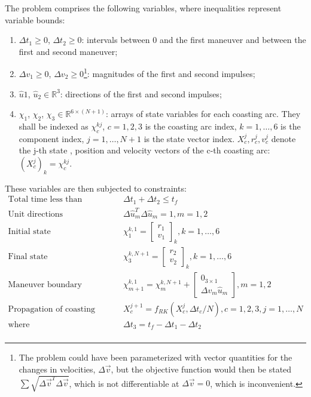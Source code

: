 The problem comprises the following variables, where inequalities represent variable bounds:
\begin{enumerate}
    \item \(\Delta t_1 \geq 0\), \(\Delta t_2 \geq 0\): intervals between 0 and the first maneuver and between the first and second maneuver;
    \item \(\Delta v_1 \geq 0\), \(\Delta v_2 \geq 0\)\footnote{The problem could have been parameterized with vector quantities for the changes in velocities, \(\Delta \vec v\), but the objective function would then be stated \(\sum \sqrt{\Delta \vec v^T \Delta \vec v}\), which is not differentiable at \(\Delta \vec v = 0\), which is inconvenient.}: magnitudes of the first and second impulses;
    \item \(\hat u 1\), \(\hat u_2 \in \mathbb{R}^3\): directions of the first and second impulses;
    \item \(\chi_1\), \(\chi_2\), \(\chi_3 \in \mathbb{R}^{6 \times (N+1)}\): arrays of state variables for each coasting arc. They shall be indexed as \(\chi_c^{kj}\), \(c=1, 2, 3\) is the coasting arc index, \(k=1,\dots,6\) is the component index, \(j = 1,\dots,N+1\) is the state vector index. \(X^j_c, r^j_c, v^j_c\) denote the j-th state , position and velocity vectors of the c-th coasting arc: \((X^j_c)_k = \chi_c^{kj}\).
\end{enumerate}

These variables are then subjected to constraints:
\begin{align}
    \text{Total time less than transfer time} &\qquad\Delta t_1 + \Delta t_2 \leq t_f \\
    \text{Unit directions} &\qquad\Delta \hat{u}_m^T \Delta \hat{u}_m = 1, m = 1, 2 \\
    \text{Initial state} &\qquad \chi_1^{k, 1} = \begin{bmatrix}
        r_1 \\ v_1
    \end{bmatrix}_k, k = 1,\dots, 6 \\
    \text{Final state} &\qquad \chi_3^{k, N+1} = \begin{bmatrix}
        r_2 \\ v_2
    \end{bmatrix}_k, k = 1,\dots, 6 \\
    \text{Maneuver boundary conditions} &\qquad \chi_{m+1}^{k, 1} = \chi_m^{k, N+1} + \begin{bmatrix}
        0_{3\times1} \\ \Delta v_m \hat{u}_m
    \end{bmatrix}, m=1, 2 \\
    \text{Propagation of coasting arcs} &\qquad X_c^{j+1} = f_{RK}(X_c^j, \Delta t_c / N), c=1, 2, 3, j=1,\dots,N \\
    \text{where} & \qquad \Delta t_3 = t_f - \Delta t_1 - \Delta t_2 \\
\end{align}

